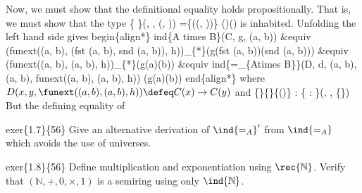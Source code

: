 Now, we must show that the definitional equality holds propositionally.  That
is, we must show that the type
  \{  \}(, , (, )) =\coqdocvar{\_}\{((, ))\} ()()
is inhabited.  Unfolding the left hand side gives
begin\{align*\}
  ind\{A times B\}(C, g, (a, b))
  \&equiv
  (funext((a, b), (fst (a, b), snd (a, b)), h))\_\{*\}(g(fst (a, b))(snd (a, b)))
  \&equiv
  (funext((a, b), (a, b), h))\_\{*\}(g(a)(b))
  \&equiv
  ind\{=\_\{Atimes B\}\}(D, d, (a, b), (a, b), funext((a, b), (a, b), h))
  (g(a)(b))
end\{align*\}
where $D(x, y, \funext((a, b), (a, b), h)) \defeq C(x) \to C(y)$ and
    \{\}\{\}\coqdocvar{\_}\{()\} : \{ :   \}(, , \{\})
But the defining equality of 


exer\{1.7\}\{56\} Give an alternative derivation of $\ind{=_{A}}'$ from
$\ind{=_{A}}$ which avoids the use of universes.


exer\{1.8\}\{56\}  Define multiplication and exponentiation using
$\rec{\mathbb{N}}$.  Verify that $(\mathbb{N}, +, 0, \times, 1)$ is a semiring
using only $\ind{\mathbb{N}}$.


